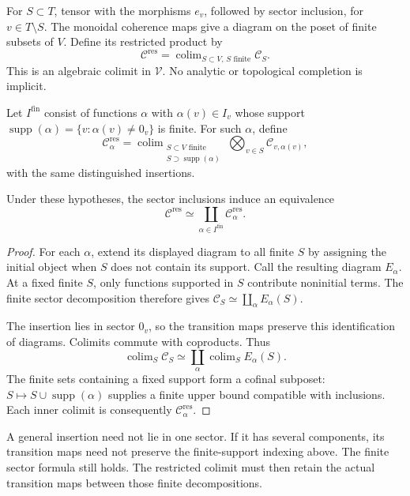 For $S\subset T$, tensor with the morphisms $e_v$, followed by sector
inclusion, for $v\in T\setminus S$. The monoidal coherence maps give a
diagram on the poset of finite subsets of $V$. Define its restricted
product by
\[
 \mathcal C^{\mathrm{res}}=\mathop{\operatorname{colim}}_{S\subset V,
                   \,S\text{ finite}}\mathcal C_S.
\]
This is an algebraic colimit in $\mathcal V$. No analytic or topological
completion is implicit.

Let $I^{\mathrm{fin}}$ consist of functions $\alpha$ with
$\alpha(v)\in I_v$ whose support
$\operatorname{supp}(\alpha)=\{v:\alpha(v)\ne0_v\}$ is finite.
For such $\alpha$, define
\[
 \mathcal C^{\mathrm{res}}_\alpha
 =\mathop{\operatorname{colim}}_{\substack{S\subset V\text{ finite}\\
                       S\supset\operatorname{supp}(\alpha)}}
       \bigotimes_{v\in S}\mathcal C_{v,\alpha(v)},
\]
with the same distinguished insertions.

\begin{proposition}
\label{v4-arith:ic:eis:restricted-sectors}
Under these hypotheses, the sector inclusions induce an equivalence
\[
 \mathcal C^{\mathrm{res}}
 \simeq\coprod_{\alpha\in I^{\mathrm{fin}}}
                   \mathcal C^{\mathrm{res}}_\alpha.
\]
\end{proposition}

\begin{proof}
For each $\alpha$, extend its displayed diagram to all finite $S$ by
assigning the initial object when $S$ does not contain its support.
Call the resulting diagram $E_\alpha$. At a fixed finite $S$, only
functions supported in $S$ contribute noninitial terms. The finite sector
decomposition therefore gives
$\mathcal C_S\simeq\coprod_\alpha E_\alpha(S)$.

The insertion lies in sector $0_v$, so the transition maps preserve this
identification of diagrams. Colimits commute with coproducts. Thus
\[
 \operatorname{colim}_S\mathcal C_S
 \simeq\coprod_\alpha\operatorname{colim}_S E_\alpha(S).
\]
The finite sets containing a fixed support form a cofinal subposet:
$S\mapsto S\cup\operatorname{supp}(\alpha)$ supplies a finite upper
bound compatible with inclusions. Each inner colimit is consequently
$\mathcal C^{\mathrm{res}}_\alpha$.
\end{proof}

A general insertion need not lie in one sector. If it has several
components, its transition maps need not preserve the finite-support
indexing above. The finite sector formula still holds. The restricted
colimit must then retain the actual transition maps between those
finite decompositions.

